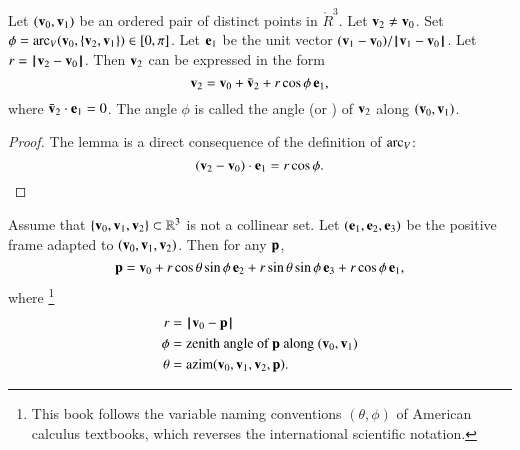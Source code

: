 \begin{lemma}[zenith]
     Let
  $({\mathbf v}_0,{\mathbf v}_1)$ be an ordered pair of distinct points in $\ring{R}^3$.
  Let ${\mathbf v}_2\ne {\mathbf v}_0$.  Set $\phi =
  \operatorname{arc}_V({\mathbf v}_0,\{{\mathbf v}_2,{\mathbf v}_1\})\in[0,\pi]$.  Let ${\mathbf e}_1$ be the unit
  vector $(\v_1-\v_0)/\norm{\v_1}{\v_0}$.  Let $r =
  \norm{\v_2}{\v_0}$.  Then ${\mathbf v}_2$ can be expressed in the form
\begin{displaymath}
{\mathbf v}_2 = {\mathbf v}_0 + \bar{{\mathbf v}}_2 +
r\cos\phi\, {\mathbf e}_1,
\end{displaymath}
where $\bar{{\mathbf v}}_2\cdot {\mathbf e}_1 = 0$.  The angle $\phi$ is called the
 angle (or ) of ${\mathbf v}_2$ along
$({\mathbf v}_0,{\mathbf v}_1)$.  %
%
\end{lemma}

\begin{proof} The lemma is a direct consequence of the definition of $\operatorname{arc}_V$:
\begin{displaymath}({\mathbf v}_2-{\mathbf v}_0)\cdot {\mathbf e}_1 = r\cos\phi.\end{displaymath}
\end{proof}

\begin{lemma}\label{lemma:sph}
  Assume that
  $\{{\mathbf v}_0,{\mathbf v}_1,{\mathbf v}_2\}\subset\mathbb{R}^3$ %
  is not a collinear set.  Let $({\mathbf e}_1,{\mathbf e}_2,{\mathbf e}_3)$ be the positive
  frame adapted to $({\mathbf v}_0,{\mathbf v}_1,{\mathbf v}_2)$.  Then for any ${\mathbf p}$,
\begin{equation}
{\mathbf p} = {\mathbf v}_0 + r \cos\theta \sin\phi\, {\mathbf e}_2 + r \sin\theta\sin\phi\, {\mathbf e}_3 +
r\cos\phi\,{\mathbf e}_1,
\label{eqn:sph}
\end{equation}
where%
  \footnote{This book follows the variable naming conventions
    $(\theta,\phi)$ of American calculus textbooks, which reverses the
    international scientific notation.} 
\begin{align*}
r &= \norm{\v_0 }{ \p}\\
\phi &= \text{zenith angle of } \p \text{ along } (\v_0,\v_1)\\
\theta &=\op{azim}(\v_0,\v_1,\v_2,\p).
\end{align*}
\end{lemma}

%
%
%
%
%
%

